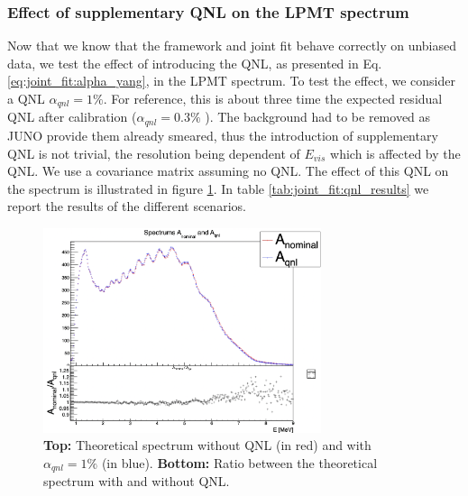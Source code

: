 \documentclass[../main.tex]{subfiles}
\begin{document}
\subsubsection{Effect of supplementary QNL on the LPMT spectrum}

Now that we know that the framework and joint fit behave correctly on unbiased data, we test the effect of introducing the QNL, as presented in Eq. \ref{eq:joint_fit:alpha_yang}, in the LPMT spectrum. To test the effect, we consider a QNL $\alpha_{qnl} = 1\%$. For reference, this is about three time the expected residual QNL after calibration ($\alpha_{qnl} = 0.3\%$ \cite{juno_collaboration_calibration_2021}). The background had to be removed as JUNO provide them already smeared, thus the introduction of supplementary QNL is not trivial, the resolution being dependent of $E_{vis}$ which is affected by the QNL.
We use a covariance matrix assuming no QNL. The effect of this QNL on the spectrum is illustrated in figure \ref{fig:joint_fit:anom_aqnl}. In table \ref{tab:joint_fit:qnl_results} we report the results of the different scenarios.

\begin{figure}[ht]
  \centering
  \includegraphics[height=6cm]{images/joint_fit/AnominalAQNL.png}
  \caption{\textbf{Top:} Theoretical spectrum without QNL (in red) and with $\alpha_{qnl} = 1\%$ (in blue). \textbf{Bottom:} Ratio between the theoretical spectrum with and without QNL.}
  \label{fig:joint_fit:anom_aqnl}
\end{figure}
\end{document}
